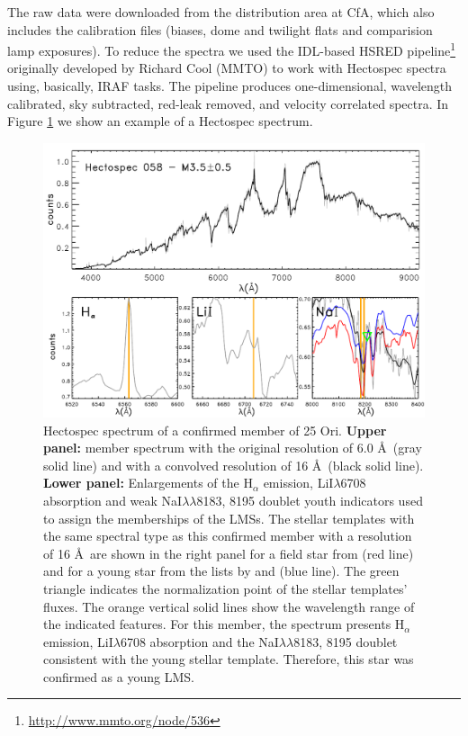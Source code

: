 \documentclass[12pt]{article}
\newcounter{subsubsubsection}[subsubsection]
\begin{document}
\label{sec_Hectospec:targets}
The raw data were downloaded from the distribution area at CfA, which also includes the calibration files (biases, dome and twilight flats and comparision lamp exposures). To reduce the spectra we used the IDL-based HSRED pipeline\footnote{\url{http://www.mmto.org/node/536}} originally developed by Richard Cool (MMTO) to work with Hectospec spectra using, basically, IRAF tasks. The pipeline produces one-dimensional, wavelength calibrated, sky subtracted, red-leak removed, and velocity correlated spectra. In Figure \ref{fig:membership_MMT} we show an example of a Hectospec spectrum.

\begin{figure}%
	\includegraphics[width=1.0\textwidth]{memberships_Hectospec.pdf}
	\caption[Hectospec spectrum of a confirmed member of 25 Ori.]{Hectospec spectrum of a confirmed member of 25 Ori. \textbf {Upper panel:} member spectrum with the original resolution of 6.0 \AA\ (gray solid line) and with a convolved resolution of 16 \AA\ (black solid line). \textbf {Lower panel:} Enlargements of the H$_\alpha$ emission, LiI$\lambda$6708 absorption and weak NaI$\lambda\lambda$8183, 8195 doublet youth indicators used to assign the memberships of the LMSs. The stellar templates with the same spectral type as this confirmed member with a resolution of 16 \AA\ are shown in the right panel for a field star from \citet{Kirkpatrick1999} (red line) and for a young star from the lists by \citet{Luhman2000,Briceno2002,Luhman2003b} and \citet{Luhman2004} (blue line). The green triangle indicates the normalization point of the stellar templates' fluxes. The orange vertical solid lines show the wavelength range of the indicated features. For this member, the spectrum presents H$_\alpha$ emission, LiI$\lambda$6708 absorption and the NaI$\lambda\lambda$8183, 8195 doublet consistent with the young stellar template. Therefore, this star was confirmed as a young LMS.}
	\label{fig:membership_MMT}
\end{figure}
\end{document}

